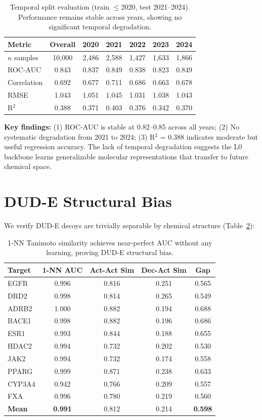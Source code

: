 \documentclass[runningheads]{llncs}
\begin{document}
\begin{table}[t]
\caption{Temporal split evaluation (train $\leq$2020, test 2021--2024). Performance remains stable across years, showing no significant temporal degradation.}
\label{tab:temporal}
\centering
\small
\begin{tabular}{@{}lcccccc@{}}
\toprule
Metric & Overall & 2020 & 2021 & 2022 & 2023 & 2024 \\
\midrule
$n$ samples & 10,000 & 2,486 & 2,588 & 1,427 & 1,633 & 1,866 \\
ROC-AUC & 0.843 & 0.837 & 0.849 & 0.838 & 0.823 & 0.849 \\
Correlation & 0.692 & 0.677 & 0.711 & 0.686 & 0.663 & 0.678 \\
RMSE & 1.043 & 1.051 & 1.045 & 1.031 & 1.038 & 1.043 \\
R$^2$ & 0.388 & 0.371 & 0.403 & 0.376 & 0.342 & 0.370 \\
\bottomrule
\end{tabular}
\end{table}

\textbf{Key findings:} (1) ROC-AUC is stable at 0.82--0.85 across all years; (2) No systematic degradation from 2021 to 2024; (3) R$^2$ = 0.388 indicates moderate but useful regression accuracy. The lack of temporal degradation suggests the L0 backbone learns generalizable molecular representations that transfer to future chemical space.

\section{DUD-E Structural Bias}
\label{app:dude_bias}

We verify DUD-E decoys are trivially separable by chemical structure (Table~\ref{tab:dude_bias}):

\begin{table}[t]
\caption{1-NN Tanimoto similarity achieves near-perfect AUC without any learning, proving DUD-E structural bias.}
\label{tab:dude_bias}
\centering
\small
\begin{tabular}{@{}lcccc@{}}
\toprule
Target & 1-NN AUC & Act-Act Sim & Dec-Act Sim & Gap \\
\midrule
EGFR & 0.996 & 0.816 & 0.251 & 0.565 \\
DRD2 & 0.998 & 0.814 & 0.265 & 0.549 \\
ADRB2 & 1.000 & 0.882 & 0.194 & 0.688 \\
BACE1 & 0.998 & 0.882 & 0.196 & 0.686 \\
ESR1 & 0.993 & 0.844 & 0.188 & 0.655 \\
HDAC2 & 0.994 & 0.732 & 0.202 & 0.530 \\
JAK2 & 0.994 & 0.732 & 0.174 & 0.558 \\
PPARG & 0.999 & 0.871 & 0.238 & 0.633 \\
CYP3A4 & 0.942 & 0.766 & 0.209 & 0.557 \\
FXA & 0.996 & 0.780 & 0.219 & 0.560 \\
\midrule
\textbf{Mean} & \textbf{0.991} & 0.812 & 0.214 & \textbf{0.598} \\
\bottomrule
\end{tabular}
\end{table}
\end{document}
